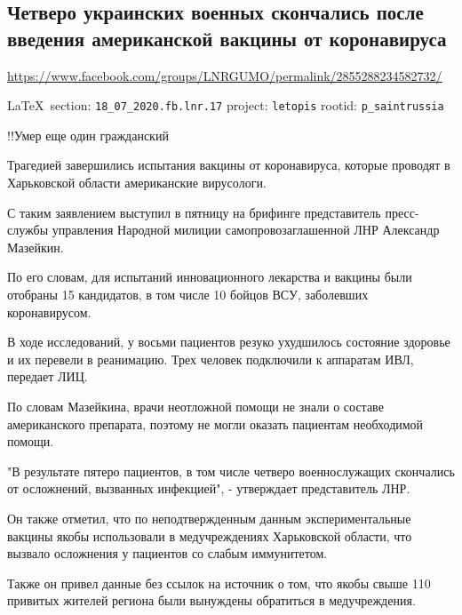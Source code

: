  
 

\subsection{Четверо украинских военных скончались после введения американской вакцины от коронавируса}
\url{https://www.facebook.com/groups/LNRGUMO/permalink/2855288234582732/}
  
\vspace{0.5cm}
{\small\LaTeX~section: \verb|18_07_2020.fb.lnr.17| project: \verb|letopis| rootid: \verb|p_saintrussia|}
\vspace{0.5cm}

!!Умер еще один гражданский

Трагедией завершились испытания вакцины от коронавируса, которые проводят в
Харьковской области американские вирусологи.

С таким заявлением выступил в пятницу на брифинге представитель пресс-службы
управления Народной милиции самопровозаглашенной ЛНР Александр Мазейкин.

По его словам, для испытаний инновационного лекарства и вакцины были отобраны
15 кандидатов, в том числе 10 бойцов ВСУ, заболевших коронавирусом.

В ходе исследований, у восьми пациентов резуко ухудшилось состояние здоровье и
их перевели в реанимацию.  Трех человек подключили к аппаратам ИВЛ, передает
ЛИЦ.

По словам Мазейкина, врачи неотложной помощи не знали о составе американского
препарата, поэтому не могли оказать пациентам необходимой помощи.

"В результате пятеро пациентов, в том числе четверо военнослужащих скончались
от осложнений, вызванных инфекцией", - утверждает представитель ЛНР.

Он также отметил, что по неподтвержденным данным экспериментальные вакцины
якобы использовали в медучреждениях Харьковской области, что вызвало осложнения
у пациентов со слабым иммунитетом.

Также он привел данные без ссылок на источник о том, что якобы свыше 110
привитых жителей региона были вынуждены обратиться в медучреждения. 
